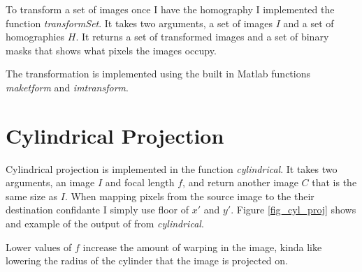 \documentclass[12pt]{article}
\begin{document}
To transform a set of images once I have the homography I implemented the function \textit{transformSet}. It takes two arguments, a set of images $I$ and a set of homographies $H$. It returns a set of transformed images and a set of binary masks that shows what pixels the images occupy.

The transformation is implemented using the built in Matlab functions \textit{maketform} and \textit{imtransform}. 


\section{Cylindrical Projection}

Cylindrical projection is implemented in the function \textit{cylindrical}. It takes two arguments, an image $I$ and focal length $f$, and return another image $C$ that is the same size as $I$. When mapping pixels from the source image to the their destination confidante I simply use floor of $x'$ and $y'$. Figure \ref{fig_cyl_proj} shows and example of the output of from \textit{cylindrical}.

Lower values of $f$ increase the amount of warping in the image, kinda like lowering the radius of the cylinder that the image is projected on.
\end{document}

